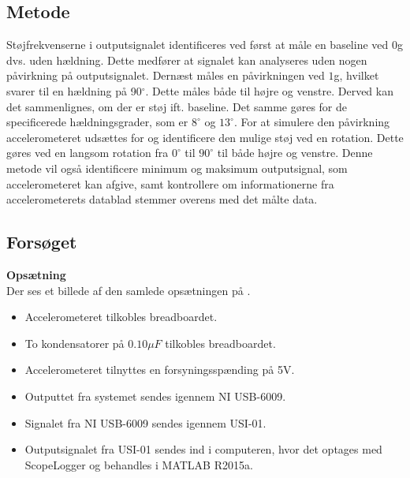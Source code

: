 \subsection{Metode}
Støjfrekvenserne i outputsignalet identificeres ved først at måle en baseline ved $0$g dvs. uden hældning. Dette medfører at signalet kan analyseres uden nogen påvirkning på outputsignalet. Dernæst måles en påvirkningen ved $1$g, hvilket svarer til en hældning på 90$^{\circ}$. Dette måles både til højre og venstre. Derved kan det sammenlignes, om der er støj ift. baseline. Det samme gøres for de specificerede hældningsgrader, som er $8^{\circ}$ og $13^{\circ}$. For at simulere den påvirkning accelerometeret udsættes for og identificere den mulige støj ved en rotation. Dette gøres ved en langsom rotation fra $0^{\circ}$ til $90^{\circ}$ til både højre og venstre. Denne metode vil også identificere minimum og maksimum outputsignal, som accelerometeret kan afgive, samt kontrollere om informationerne fra accelerometerets datablad stemmer overens med det målte data.

\subsection{Forsøget}
\textbf{Opsætning}\\
Der ses et billede af den samlede opsætningen på .
\begin{itemize}
\item Accelerometeret tilkobles breadboardet.
\item To kondensatorer på $0.10 \mu F$ tilkobles breadboardet. 
\item Accelerometeret tilnyttes en forsyningsspænding på 5V.
\item Outputtet fra systemet sendes igennem NI USB-6009.
\item Signalet fra NI USB-6009 sendes igennem USI-01. 
\item Outputsignalet fra USI-01 sendes ind i computeren, hvor det optages med ScopeLogger og behandles i MATLAB R2015a.
\end{itemize}

